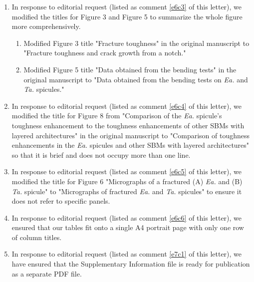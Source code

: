 \documentclass[11pt,letterpaper]{report}
\begin{document}
\begin{enumerate}[label=\textit{Ec.\arabic*}]
\item \label{Display2} In response to editorial request (listed as comment \ref{e6c3} of this letter), we modified the titles for Figure 3 and Figure 5 to summarize the whole figure more comprehensively.
\begin{enumerate}[label=\textit{\ref{Display2}.\roman*}]
    \item Modified Figure 3 title "Fracture toughness" in the original manuscript to "Fracture toughness and crack growth from a notch."
    \item Modified Figure 5 title  "Data obtained from the bending tests" in the original manuscript to "Data obtained from the bending tests on \textit{Ea.} and \textit{Ta.} spicules."
\end{enumerate}

\item \label{Display3} In response to editorial request (listed as comment \ref{e6c4} of this letter),  we modified the title for Figure 8 from  "Comparison of the \textit{Ea.} spicule's toughness enhancement to the toughness enhancements of other SBMs with layered architectures" in the original manuscript to "Comparison of toughness enhancements in the \textit{Ea.} spicules and other SBMs with layered architectures" so that it is brief and does not occupy more than one line.

\item \label{Display4} In response to editorial request (listed as comment \ref{e6c5} of this letter), we modified the title for Figure 6 "Micrographs of a fractured (A) \textit{Ea.} and (B) \textit{Ta.} spicule" to "Micrographs of fractured \textit{Ea.} and \textit{Ta.} spicules" to ensure it does not refer to specific panels.

\item \label{Display5} In response to editorial request (listed as comment \ref{e6c6} of this letter), we ensured that our tables fit onto a single A4 portrait page with only one row of column titles.






\item \label{Supplementary1} In response to editorial request (listed as comment \ref{e7c1} of this letter), we have ensured that the Supplementary Information file is ready for publication as a separate PDF file.


\end{enumerate}
\end{document}
